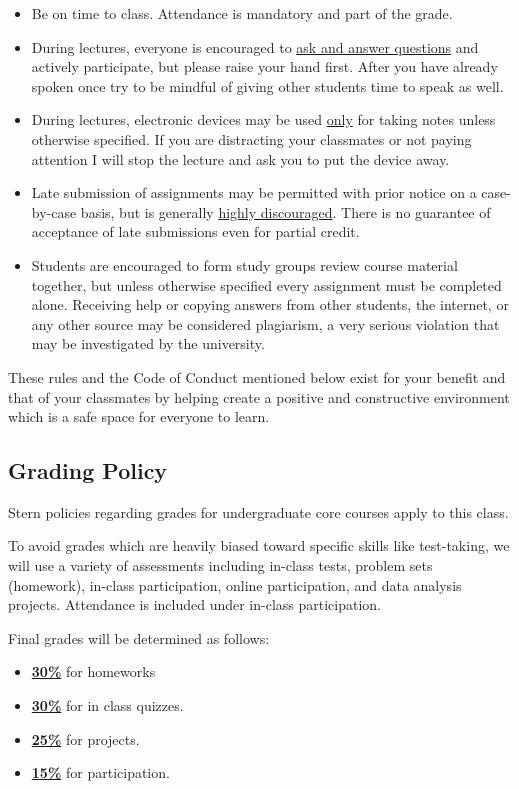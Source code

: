 \documentclass[11pt]{article}
\begin{document}
\begin{itemize}
\item Be on time to class. Attendance is mandatory and part of the grade.
\item During lectures, everyone is encouraged to \underline{ask and answer questions} and actively participate, but please raise your hand first. After you have already spoken once try to be mindful of giving other students time to speak as well.
\item During lectures, electronic devices may be used \underline{only} for taking notes unless otherwise specified. If you are distracting your classmates or not paying attention I will stop the lecture and ask you to put the device away.
\item Late submission of assignments may be permitted with prior notice on a case-by-case basis, but is generally \underline{highly discouraged}. There is no guarantee of acceptance of late submissions even for partial credit.
\item Students are encouraged to form study groups review course material together, but unless otherwise specified every assignment must be completed alone. Receiving help or copying answers from other students, the internet, or any other source may be considered plagiarism, a very serious violation that may be investigated by the university.
\end{itemize}

These rules and the Code of Conduct mentioned below exist for your benefit and that of your classmates by helping create a positive and constructive environment which is a safe space for everyone to learn.

\subsection*{Grading Policy}

Stern policies regarding grades for undergraduate core courses apply to this class.

To avoid grades which are heavily biased toward specific skills like test-taking, we will use a variety of assessments including in-class tests, problem sets (homework), in-class participation, online participation, and data analysis projects. Attendance is included under in-class participation.

Final grades will be determined as follows:
\begin{itemize}
    \item \underline{\textbf{30\%}} for homeworks
    \item \underline{\textbf{30\%}} for in class quizzes.  
    \item \underline{\textbf{25\%}} for projects.
    \item \underline{\textbf{15\%}} for participation.
\end{itemize}
\end{document}
